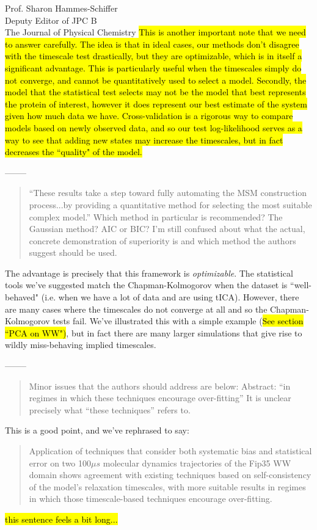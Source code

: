\documentclass{letter}
\newcommand{\separate}{\begin{center}--------\end{center}}
\begin{document}
\begin{letter}{Prof. Sharon Hammes-Schiffer \\ Deputy Editor of JPC B \\ The Journal of Physical Chemistry}
\hl{This is another important note that we need to answer carefully. The idea is that in ideal cases, our methods don't disagree with the timescale test drastically, but they are optimizable, which is in itself a significant advantage. This is particularly useful when the timescales simply do not converge, and cannot be quantitatively used to select a model. Secondly, the model that the statistical test selects may not be the model that best represents the protein of interest, however it does represent our best estimate of the system given how much data we have. Cross-validation is a rigorous way to compare models based on newly observed data, and so our test log-likelihood serves as a way to see that adding new states may increase the timescales, but in fact decreases the ``quality" of the model.}

\separate
\begin{quote}
``These results take a step toward fully automating the MSM construction process...by providing a quantitative method for selecting the most suitable complex model.''  Which method in particular is recommended?  The Gaussian method?  AIC or BIC?  I'm still confused about what the actual, concrete demonstration of superiority is and which method the authors suggest should be used.
\end{quote}

The advantage is precisely that this framework is {\it optimizable}. The statistical tools we've suggested match the Chapman-Kolmogorov when the dataset is ``well-behaved" (i.e. when we have a lot of data and are using tICA). However, there are many cases where the timescales do not converge at all and so the Chapman-Kolmogorov tests fail. We've illustrated this with a simple example (\hl{See section ``PCA on WW")}, but in fact there are many larger simulations that give rise to wildly miss-behaving implied timescales.

\separate
\begin{quote}
Minor issues that the authors should address are below:
Abstract: ``in regimes in which these techniques encourage over-fitting''  It is unclear precisely what ``these techniques'' refers to.
\end{quote}
This is a good point, and we've rephrased to say:
\begin{quote}
Application of techniques that consider both systematic bias and statistical error on two 100$\mu s$ molecular dynamics trajectories of the Fip35 WW domain shows agreement with existing techniques based on self-consistency of the model's relaxation timescales, with more suitable results in regimes in which those timescale-based techniques encourage over-fitting.
\end{quote} \hl{this sentence feels a bit long...}


\end{letter}
\end{document}
